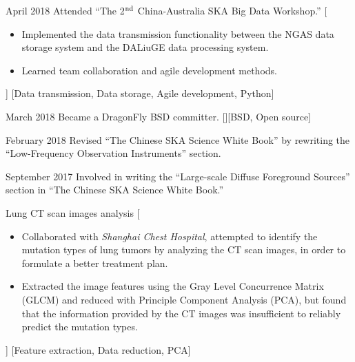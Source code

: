 \documentclass{resume}
\begin{document}
\begin{experiences}
  \experience
    {April 2018}%
    {Attended \enquote{The 2$^{\rm nd}$ China-Australia SKA Big Data Workshop.}}%
    [\begin{itemize}
      \item Implemented the data transmission functionality between the
        NGAS data storage system and the DALiuGE data processing system.
      \item Learned team collaboration and agile development methods.
    \end{itemize}]%
    [Data transmission, Data storage, Agile development, Python]

  \separator{0.5em}
  \experience
    {March 2018}%
    {Became a DragonFly BSD committer.}%
    [][BSD, Open source]


  \separator{0.5em}
  \experience
    {February 2018}%
    {Revised \enquote{The Chinese SKA Science White Book} by
      rewriting the \enquote{Low-Frequency Observation Instruments} section.}


  \separator{0.5em}
  \experience
    {September 2017}%
    {Involved in writing the
      \enquote{Large-scale Diffuse Foreground Sources} section in
      \enquote{The Chinese SKA Science White Book.}}

  \separator{0.5em}
    {Lung CT scan images analysis}%
    [\begin{itemize}
      \item Collaborated with \textit{Shanghai Chest Hospital},
        attempted to identify the mutation types of lung tumors
        by analyzing the CT scan images, in order to formulate a
        better treatment plan.
      \item Extracted the image features using the Gray Level Concurrence
        Matrix (GLCM) and reduced with Principle Component Analysis (PCA),
        but found that the information provided by the CT images was
        insufficient to reliably predict the mutation types.
    \end{itemize}]%
    [Feature extraction, Data reduction, PCA]


\end{experiences}
\end{document}
